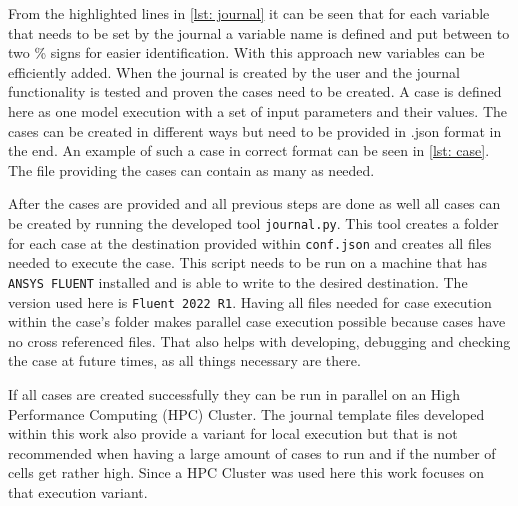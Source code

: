 \documentclass[../thesis.tex]{subfiles}
\begin{document}
% 
%



From the highlighted lines in \autoref{lst: journal} it can be seen that for each variable that needs to be set by the journal a variable name is defined and put between to two \% signs for easier identification. With this approach new variables can be efficiently added. When the journal is created by the user and the journal functionality is tested and proven the cases need to be created. A case is defined here as one model execution with a set of input parameters and their values. The cases can be created in different ways but need to be provided in .json format in the end. An example of such a case in correct format can be seen in \autoref{lst: case}. The file providing the cases can contain as many as needed. 



After the cases are provided and all previous steps are done as well all cases can be created by running the developed tool \texttt{journal.py}.
This tool creates a folder for each case at the destination provided within \texttt{conf.json} and creates all files needed to execute the case. This script needs to be run on a machine that has \texttt{ANSYS FLUENT} installed and is able to write to the desired destination. The version used here is \texttt{Fluent 2022 R1}. Having all files needed for case execution within the case's folder makes parallel case execution possible because cases have no cross referenced files. That also helps with developing, debugging and checking the case at future times, as all things necessary are there.

If all cases are created successfully they can be run in parallel on an High Performance Computing (HPC) Cluster. The journal template files developed within this work also provide a variant for local execution but that is not recommended when having a large amount of cases to run and if the number of cells get rather high. Since a HPC Cluster was used here this work focuses on that execution variant.
\end{document}
